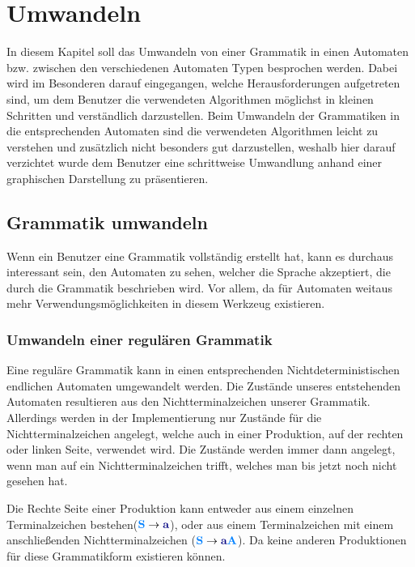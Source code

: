 

\chapter{Umwandeln}\label{ConverTo}

In diesem Kapitel soll das Umwandeln von einer Grammatik in einen Automaten
bzw. zwischen den verschiedenen Automaten Typen besprochen werden. Dabei wird
im Besonderen darauf eingegangen, welche Herausforderungen aufgetreten sind, um
dem Benutzer die verwendeten Algorithmen möglichst in kleinen Schritten und
verständlich darzustellen. Beim Umwandeln der Grammatiken in die entsprechenden
Automaten sind die verwendeten Algorithmen leicht zu verstehen und zusätzlich
nicht besonders gut darzustellen, weshalb hier darauf verzichtet wurde dem
Benutzer eine schrittweise Umwandlung anhand einer graphischen Darstellung zu
präsentieren.


\section{Grammatik umwandeln}\label{ConverToGrammar}

Wenn ein Benutzer eine Grammatik vollständig erstellt hat, kann es durchaus
interessant sein, den Automaten zu sehen, welcher die Sprache akzeptiert, die
durch die Grammatik beschrieben wird. Vor allem, da für Automaten weitaus mehr
Verwendungsmöglichkeiten in diesem Werkzeug existieren. 

\subsection{Umwandeln einer regulären Grammatik}\label{ConverToGrammarRegular}

Eine reguläre Grammatik kann in einen entsprechenden Nichtdeterministischen
endlichen Automaten umgewandelt werden. Die Zustände unseres entstehenden
Automaten resultieren aus den Nichtterminalzeichen unserer Grammatik. Allerdings
werden in der Implementierung nur Zustände für die Nichtterminalzeichen angelegt,
welche auch in einer Produktion, auf der rechten oder linken Seite, verwendet
wird. Die Zustände werden immer dann angelegt, wenn man auf ein
Nichtterminalzeichen trifft, welches man bis jetzt noch nicht gesehen
hat.\vspace{10pt}

Die Rechte Seite einer Produktion kann entweder aus einem einzelnen
Terminalzeichen bestehen($\NonterminalSymbol{S} \to \TerminalSymbol{a}$), oder
aus einem Terminalzeichen mit einem anschließenden Nichtterminalzeichen
($\NonterminalSymbol{S} \to \TerminalSymbol{a}\NonterminalSymbol{A}$). Da keine
anderen Produktionen für diese Grammatikform existieren können.\vspace{10pt}

